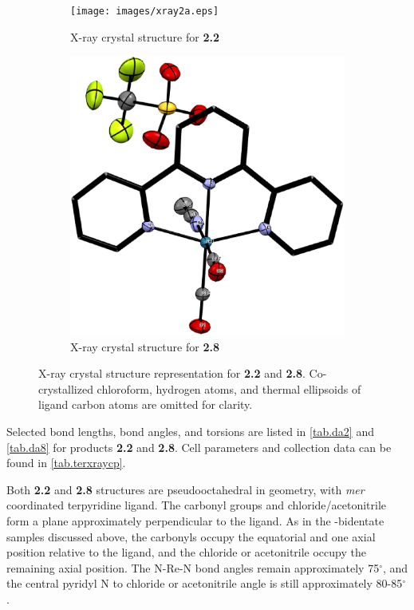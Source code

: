 \begin{figure}[!ht]
 \centering
 \begin{subfigure}[b]{0.49\textwidth}
  \texttt{[image: images/xray2a.eps]}
  \caption{X-ray crystal structure for \textbf{2.2}}
  \label{fig.da2}
 \end{subfigure}
 \begin{subfigure}[b]{0.49\textwidth}
  \includegraphics[clip=true, width=\textwidth, keepaspectratio]{images/xray8a.eps}
  \caption{X-ray crystal structure for \textbf{2.8}}
  \label{fig.da8}
 \end{subfigure}
\caption[X-ray crystal structure representation for \textbf{2} and \textbf{8}.]{X-ray crystal structure representation for \textbf{2.2} and \textbf{2.8}. Co-crystallized chloroform, hydrogen atoms, and thermal ellipsoids of ligand carbon atoms are omitted for clarity.}
\label{fig.xrayter}
\end{figure} 

Selected bond lengths, bond angles, and torsions are listed in \autoref{tab.da2} and \autoref{tab.da8} for products \textbf{2.2} and \textbf{2.8}. Cell parameters and collection data can be found in \autoref{tab.terxraycp}. 

Both \textbf{2.2} and \textbf{2.8} structures are pseudooctahedral in geometry, with \textit{mer} coordinated terpyridine ligand. The carbonyl groups and chloride/acetonitrile form a plane approximately perpendicular to the ligand. As in the -bidentate samples discussed above, the carbonyls occupy the equatorial and one axial position relative to the ligand, and the chloride or acetonitrile occupy the remaining axial position. The N-Re-N bond angles remain approximately 75$^\circ$, and the central pyridyl N to chloride or acetonitrile angle is still approximately 80-85$^\circ$. 

